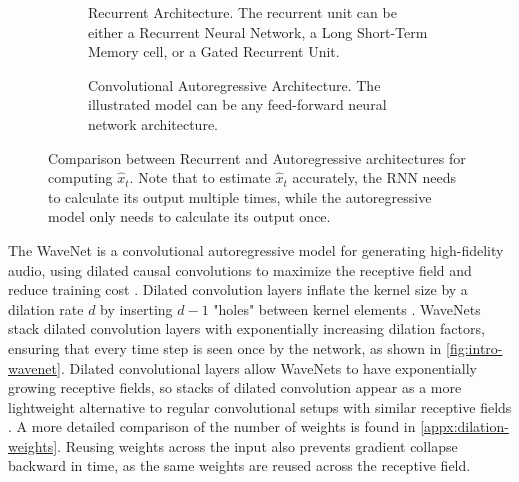\begin{figure}[t]  
\centering 
  \begin{subfigure}[b]{0.45\linewidth}
  \resizebox{\columnwidth}{!}
    {
    }
  \caption{Recurrent Architecture. The recurrent unit can be either a Recurrent Neural Network, a Long Short-Term Memory cell, or a Gated Recurrent Unit.
  } \label{fig:intro-rnn}  
  \end{subfigure}
  \hfill
  \begin{subfigure}[b]{0.45\linewidth}
  \resizebox{\columnwidth}{!}
    {
    }
    \caption{
    Convolutional Autoregressive Architecture.
    The illustrated model can be any feed-forward neural network architecture.  
    } \label{fig:intro-ar}  
  \end{subfigure}
  \caption{
  Comparison between Recurrent and Autoregressive architectures for computing $\hat{x}_t$. Note that to estimate $\hat{x}_t$ accurately, the RNN needs to calculate its output multiple times, while the autoregressive model only needs to calculate its output once. 
  }
\end{figure}  

The WaveNet is a convolutional autoregressive model for generating high-fidelity audio, using dilated causal convolutions to maximize the receptive field and reduce training cost \cite{oord_wavenet_2016, kalchbrenner_neural_2017}.
Dilated convolution layers inflate the kernel size by a dilation rate $d$ by inserting $d-1$ "holes" between kernel elements
\cite{dutilleux_implementation_1990}.
WaveNets stack dilated convolution layers with exponentially increasing dilation factors, ensuring that every time step is seen once by the network, as shown in \cref{fig:intro-wavenet}.
Dilated convolutional layers allow WaveNets to have exponentially growing receptive fields, so stacks of dilated convolution appear as a more lightweight alternative to regular convolutional setups with similar receptive fields
\cite{yu_multi-scale_2016}.
A more detailed comparison of the number of weights is found in \cref{appx:dilation-weights}.
Reusing weights across the input also prevents gradient collapse backward in time, as the same weights are reused across the receptive field.

